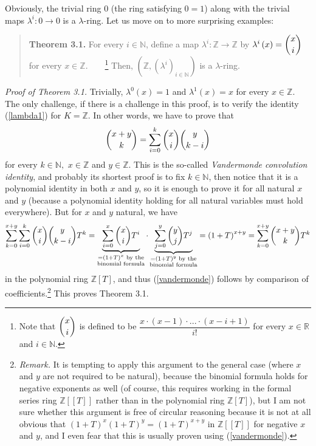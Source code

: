 \documentclass[12pt,final,notitlepage,onecolumn,german]{article}%
\begin{document}
Obviously, the trivial ring $0$ (the ring satisfying $0=1$) along with the
trivial maps $\lambda^{i}:0\rightarrow0$ is a $\lambda$-ring. Let us move on
to more surprising examples:

\begin{quote}
\textbf{Theorem 3.1.} For every $i\in\mathbb{N}$, define a map $\lambda
^{i}:\mathbb{Z}\rightarrow\mathbb{Z}$ by $\lambda^{i}\left(  x\right)
=\dbinom{x}{i}$ for every $x\in\mathbb{Z}$.\ \ \ \ \footnote{Note that
$\dbinom{x}{i}$ is defined to be $\dfrac{x\cdot\left(  x-1\right)
\cdot...\cdot\left(  x-i+1\right)  }{i!}$ for every $x\in\mathbb{R}$ and
$i\in\mathbb{N}$.} Then, $\left(  \mathbb{Z},\left(  \lambda^{i}\right)
_{i\in\mathbb{N}}\right)  $ is a $\lambda$-ring.
\end{quote}

\textit{Proof of Theorem 3.1.} Trivially, $\lambda^{0}\left(  x\right)  =1$
and $\lambda^{1}\left(  x\right)  =x$ for every $x\in\mathbb{Z}$. The only
challenge, if there is a challenge in this proof, is to verify the identity
(\ref{lambda1}) for $K=\mathbb{Z}$. In other words, we have to prove that%
\begin{equation}
\dbinom{x+y}{k}=\sum_{i=0}^{k}\dbinom{x}{i}\dbinom{y}{k-i} \label{vandermonde}%
\end{equation}
for every $k\in\mathbb{N},$ $x\in\mathbb{Z}$ and $y\in\mathbb{Z}.$ This is the
so-called \textit{Vandermonde convolution identity}, and probably its shortest
proof is to fix $k\in\mathbb{N}$, then notice that it is a polynomial identity
in both $x$ and $y$, so it is enough to prove it for all natural $x$ and $y$
(because a polynomial identity holding for all natural variables must hold
everywhere). But for $x$ and $y$ natural, we have%
\[
\sum_{k=0}^{x+y}\sum_{i=0}^{k}\dbinom{x}{i}\dbinom{y}{k-i}T^{k}=\underbrace
{\sum_{i=0}^{x}\dbinom{x}{i}T^{i}}_{\substack{=\left(  1+T\right)  ^{x}\text{
by the}\\\text{binomial formula}}}\cdot\underbrace{\sum_{j=0}^{y}\dbinom{y}%
{j}T^{j}}_{\substack{=\left(  1+T\right)  ^{y}\text{ by the}\\\text{binomial
formula}}}=\left(  1+T\right)  ^{x+y}=\sum_{k=0}^{x+y}\dbinom{x+y}{k}T^{k}%
\]
in the polynomial ring $\mathbb{Z}\left[  T\right]  $, and thus
(\ref{vandermonde}) follows by comparison of
coefficients.\footnote{\textit{Remark.} It is tempting to apply this argument
to the general case (where $x$ and $y$ are not required to be natural),
because the binomial formula holds for negative exponents as well (of course,
this requires working in the formal series ring $\mathbb{Z}\left[  \left[
T\right]  \right]  $ rather than in the polynomial ring $\mathbb{Z}\left[
T\right]  $), but I am not sure whether this argument is free of circular
reasoning because it is not at all obvious that $\left(  1+T\right)
^{x}\left(  1+T\right)  ^{y}=\left(  1+T\right)  ^{x+y}$ in $\mathbb{Z}\left[
\left[  T\right]  \right]  $ for negative $x$ and $y$, and I even fear that
this is usually proven using (\ref{vandermonde}).} This proves Theorem 3.1.
\end{document}

